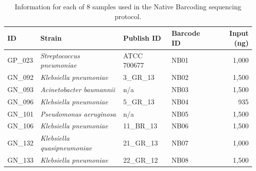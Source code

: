 \begin{table}[!htb]
\caption{Information for each of 8 samples used in the Native Barcoding sequencing protocol.}
\label{supp_tab:sample}
\centering
\begin{tabular}{l|l|l|l|r}
\textbf{ID} & \textbf{Strain}          & \textbf{Publish ID} & \textbf{Barcode ID} & \textbf{Input (ng)} \\\hline
GP\_023            & \emph{Streptococcus pneumoniae} &        ATCC 700677              & NB01                & 1,000                \\
GN\_092            & \emph{Klebsiella pneumoniae}    &         3\_GR\_13~\cite{Miranda2018}             & NB02                & 1,500                \\
GN\_093            & \emph{Acinetobacter baumannii}  &          n/a            & NB03                & 1,500                \\
GN\_096            & \emph{Klebsiella pneumoniae}    &         5\_GR\_13~\cite{Miranda2018}              & NB04                & 935                 \\
GN\_101            & \emph{Pseudomonas aeruginosa}   &          n/a            & NB05                & 1,500                \\
GN\_106            & \emph{Klebsiella pneumoniae}    &         11\_BR\_13~\cite{Miranda2018}              & NB06                & 1,500                \\
GN\_132            & \emph{Klebsiella quasipneumoniae}    &         21\_GR\_13~\cite{Miranda2018}              & NB07                & 1,000                \\
GN\_133            & \emph{Klebsiella pneumoniae}    &         22\_GR\_12~\cite{Miranda2018}              & NB08                & 1,500               
\end{tabular}
\end{table}



